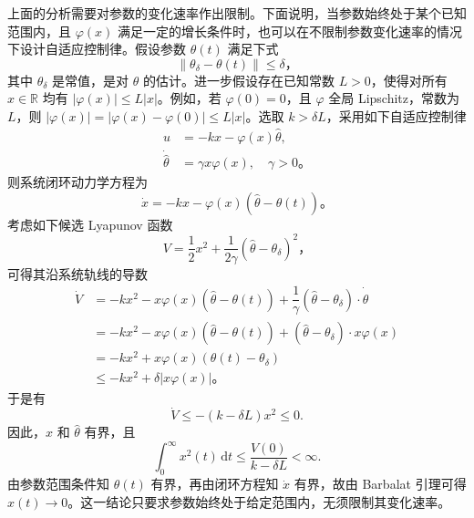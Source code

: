 上面的分析需要对参数的变化速率作出限制。下面说明，当参数始终处于某个已知范围内，且 $\varphi(x)$ 满足一定的增长条件时，也可以在不限制参数变化速率的情况下设计自适应控制律。假设参数 $\theta(t)$ 满足下式
\[
    \| \theta_\delta - \theta(t) \| \leq \delta \text{，}
\]
其中 $\theta_\delta$ 是常值，是对 $\theta$ 的估计。进一步假设存在已知常数 $L>0$，使得对所有 $x\in\mathbb{R}$ 均有 $|\varphi(x)|\le L|x|$。例如，若 $\varphi(0)=0$，且 $\varphi$ 全局 Lipschitz，常数为 $L$，则 $|\varphi(x)|=|\varphi(x)-\varphi(0)|\le L|x|$。选取 $k>\delta L$，采用如下自适应控制律
\begin{align*}
    u &= -k x - \varphi(x) \hat{\theta}, \\
    \dot{\hat{\theta}} &= \gamma x \varphi(x), \quad \gamma > 0 \text{。}
\end{align*}
则系统闭环动力学方程为
\[
    \dot{x} = -k x - \varphi(x) \left( \hat{\theta} - \theta(t) \right) \text{。}
\]
考虑如下候选 Lyapunov 函数
\[
    V = \dfrac{1}{2} x^2 + \frac{1}{2 \gamma} {\left( \hat{\theta} - \theta_\delta \right)}^2 \text{，}
\]
可得其沿系统轨线的导数
\begin{align*}
    \dot{V} &= -k x^2 - x \varphi(x) \left( \hat{\theta} - \theta(t) \right) + \dfrac{1}{\gamma} \left( \hat{\theta} - \theta_\delta \right) \cdot \dot{\hat{\theta}} \\
    &= -k x^2 - x \varphi(x) \left( \hat{\theta} - \theta(t) \right) +  \left( \hat{\theta} - \theta_\delta \right) \cdot x \varphi(x) \\
    &= -k x^2 + x \varphi(x) \left( \theta(t) - \theta_\delta \right) \\
    &\leq -k x^2 + \delta |x \varphi(x)| \text{。}
\end{align*}
于是有
\[
    \dot V\le-(k-\delta L)x^2\le0.
\]
因此，$x$ 和 $\hat\theta$ 有界，且
\[
    \int_0^\infty x^2(t)\,\mathrm{d}t\le\frac{V(0)}{k-\delta L}<\infty.
\]
由参数范围条件知 $\theta(t)$ 有界，再由闭环方程知 $\dot x$ 有界，故由 Barbalat 引理可得 $x(t)\to0$。这一结论只要求参数始终处于给定范围内，无须限制其变化速率。
